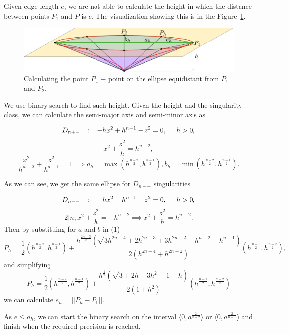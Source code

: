 Given edge length $e$, we are not able to calculate the height in which the distance
between points $P_1$ and $P$ is $e$. The visualization showing this is in the Figure~\ref{img:17}.

\begin{figure}
    \centerline{\includegraphics[scale=0.5]{images/img17}}
    \caption[Calculating the point $P_h$]
    {Calculating the point $P_h$ $-$ point on the ellipse equidistant from $P_1$ and $P_2$.}
    \label{img:17}
\end{figure}

We use binary search to find such height.
Given the height and the singularity class, we can calculate the semi-major axis
and semi-minor axis as 

$$D_{n+-} \hspace{3mm} :\hspace{3mm}  -hx^2+h^{n-1}-z^2 = 0, \hspace{5mm} h>0,$$
$$x^2 + \frac{z^2}{h} = h^{n-2},$$
$$\frac{x^2}{h^{n-2}} + \frac{z^2}{h^{n-1}} = 1 \implies a_h=\max(h^\frac{n-2}{2}, h^\frac{n-1}{2}), b_h=\min(h^\frac{n-2}{2}, h^\frac{n-1}{2}).$$

As we can see, we get the same ellipse for $D_{n--}$ singularities

$$D_{n--} \hspace{3mm} :\hspace{3mm}  -hx^2-h^{n-1}-z^2 = 0, \hspace{5mm} h>0,$$
$$2|n, x^2 + \frac{z^2}{h} = -h^{n-2} \implies x^2 + \frac{z^2}{h} = h^{n-2}.$$
Then by substituing for $a$ and $b$ in (1)
$$P_h=\frac{1}{2}(h^\frac{n-2}{2},h^\frac{n-1}{2}) + \frac{h^\frac{2n-3}{2}(\sqrt{3h^{2n-4}+2h^{2n-3}+3h^{2n-2}}-h^{n-2}-h^{n-1})}{2(h^{2n-4}+h^{2n-2})}(h^\frac{n-1}{2},h^\frac{n-2}{2}),$$
and simplifying
$$P_h=\frac{1}{2}(h^\frac{n-2}{2},h^\frac{n-1}{2}) + \frac{h^\frac{1}{2}(\sqrt{3+2h+3h^2}-1-h)}{2(1+h^2)}(h^\frac{n-1}{2},h^\frac{n-2}{2})$$
we can calculate $e_h=||P_h-P_1||$.

As $e \leq a_h$, we can start the binary search on the interval
$\langle 0, a^\frac{2}{n-2}\rangle$ or $\langle 0, a^\frac{2}{n-1}\rangle$
and finish when the required precision is reached.

